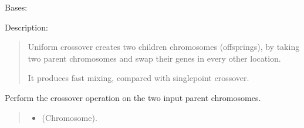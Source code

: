 \documentclass[letterpaper,10pt,english]{sphinxmanual}
\begin{document}
\begin{fulllineitems}
\label{\detokenize{pygenalgo.operators.crossover:pygenalgo.operators.crossover.uniform_crossover.UniformCrossover}}
\pysigstartsignatures
{}
\pysigstopsignatures
\sphinxAtStartPar
Bases: {\hyperref[\detokenize{pygenalgo.operators.crossover:pygenalgo.operators.crossover.crossover_operator.CrossoverOperator}]{}}

\sphinxAtStartPar
Description:
\begin{quote}

\sphinxAtStartPar
Uniform crossover creates two children chromosomes (offsprings),
by taking two parent chromosomes and swap their genes in every
other location.

\sphinxAtStartPar
It produces fast mixing, compared with single\sphinxhyphen{}point crossover.
\end{quote}

\begin{fulllineitems}
\label{\detokenize{pygenalgo.operators.crossover:pygenalgo.operators.crossover.uniform_crossover.UniformCrossover.crossover}}
\pysigstartsignatures
{}
\pysigstopsignatures
\sphinxAtStartPar
Perform the crossover operation on the two input parent chromosomes.
\begin{quote}\begin{description}
\begin{itemize}
\item {} 
\sphinxAtStartPar
{} \textendash{} (Chromosome).


\end{itemize}
\end{description}
\end{quote}
\end{fulllineitems}
\end{fulllineitems}
\end{document}
